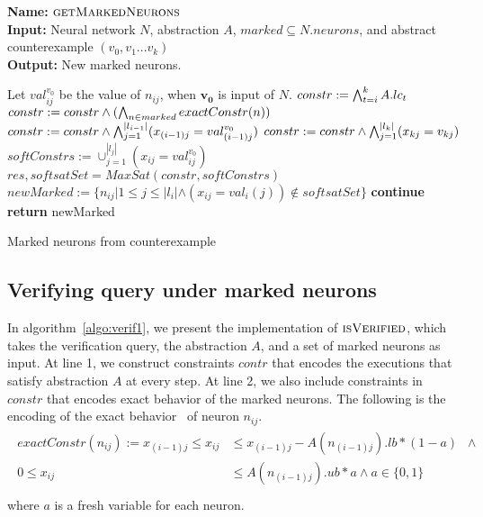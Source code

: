 \begin{algorithm}[t]
  \textbf{Name: } $\textsc{getMarkedNeurons}$ \\
  \textbf{Input: } Neural network $N$, \deeppoly{} abstraction $A$, $marked\subseteq N.neurons$, and abstract counterexample $({v_0}, {v_1} ... {v_k})$\\
  \textbf{Output: } New marked neurons. 
  \begin{algorithmic}[1]
    \State Let ${val^{v_0}_{ij}}$ be the value of $n_{ij}$, when $\boldsymbol{v_0}$ is input of $N$. 
     
        \State $constr := \bigwedge_{t=i}^k A.lc_t$
        \State $constr := constr \land (\bigwedge_{n \in marked} exactConstr(n))$ 
        \State $constr := constr \land \bigwedge_{j=1}^{|l_{i-1}|} (x_{(i-1)j} = val^{v_0}_{(i-1)j})$
        \State $constr := constr \land \bigwedge_{j=1}^{|l_k|} (x_{kj} = v_{kj})$
        \State $softConstrs := \cup_{j=1}^{|l_j|} (x_{ij} = val^{v_0}_{ij})$
        \State $res, softsatSet = MaxSat(constr, softConstrs)$ 
        \State $newMarked := \{n_{ij} | 1 \leq j \leq |l_i| \land (x_{ij} = val_i(j)) \notin  softsatSet\}$ 
          \State \textbf{continue}
        \Else
          \State \textbf{return} newMarked
        \EndIf 
      \EndIf
    \EndFor
  \end{algorithmic}
  \caption{Marked neurons from counterexample}
  \label{algo:refine2}
\end{algorithm}


\subsection{Verifying query under marked neurons}

In algorithm~\ref{algo:verif1}, we present the implementation of 
$\textsc{isVerified}$, which takes the verification query, the \deeppoly{} abstraction $A$,
and a set of marked neurons as input.
At line 1, we construct constraints $contr$ that encodes the executions that satisfy abstraction
$A$ at every step.
At line 2, we also include constraints in $constr$ that encodes exact behavior of the marked
neurons. The following is the encoding of the exact behavior~\cite{exact} of neuron $n_{ij}$.
\begin{align}
    \label{eq:reluexact}
    \begin{split}
      exactConstr(n_{ij}) := x_{(i-1)j} \leq x_{ij} &\leq x_{(i-1)j} - A(n_{(i-1)j}).lb*(1-a) \;\;\land  \\
        0 \leq x_{ij} &\leq A(n_{(i-1)j}).ub*a \land a \in \{0,1\} \\ 
    \end{split}
\end{align}
where $a$ is a fresh variable for each neuron.


